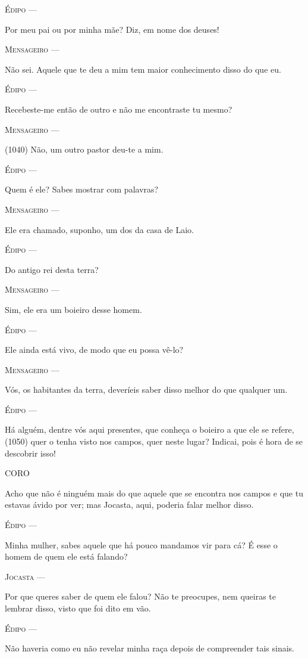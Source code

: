 \textsc{Édipo} ---

Por meu pai ou por minha mãe? Diz, em nome dos deuses!

\textsc{Mensageiro} ---

Não sei. Aquele que te deu a mim tem maior conhecimento disso do que eu.

\textsc{Édipo} ---

Recebeste-me então de outro e não me encontraste tu mesmo?

\textsc{Mensageiro} ---

(1040) Não, um outro pastor deu-te a mim.

\textsc{Édipo} ---

Quem é ele? Sabes mostrar com palavras?

\textsc{Mensageiro} ---

Ele era chamado, suponho, um dos da casa de Laio.

\textsc{Édipo} ---

Do antigo rei desta terra?

\textsc{Mensageiro} ---

Sim, ele era um boieiro desse homem.

\textsc{Édipo} ---

Ele ainda está vivo, de modo que eu possa vê-lo?

\textsc{Mensageiro} ---

Vós, os habitantes da terra, deveríeis saber disso melhor do que
qualquer um.

\textsc{Édipo} ---

Há alguém, dentre vós aqui presentes, que conheça o boieiro a que ele se
refere, (1050) quer o tenha visto nos campos, quer neste lugar? Indicai,
pois é hora de se descobrir isso!

\textsc{CORO}

Acho que não é ninguém mais do que aquele que se encontra nos campos e
que tu estavas ávido por ver; mas Jocasta, aqui, poderia falar melhor
disso.

\textsc{Édipo} ---

Minha mulher, sabes aquele que há pouco mandamos vir para cá? É esse o
homem de quem ele está falando?

\textsc{Jocasta} ---

Por que queres saber de quem ele falou? Não te preocupes, nem queiras te
lembrar disso, visto que foi dito em vão.

\textsc{Édipo} ---

Não haveria como eu não revelar minha raça depois de compreender tais
sinais.

